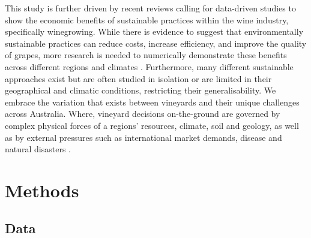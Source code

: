 \documentclass[review,12pt,authoryear]{elsarticle}
\begin{document}
\begin{linenumbers}
This study is further driven by recent reviews calling for data-driven studies to show the economic benefits of sustainable practices within the wine industry, specifically winegrowing. While there is evidence to suggest that environmentally sustainable practices can reduce costs, increase efficiency, and improve the quality of grapes, more research is needed to numerically demonstrate these benefits across different regions and climates \citep{baianoOverviewSustainabilityWine2021,marianiSustainableWinegrowingCurrent2015,montalvo-falconSustainabilityResearchWine2023, laurentReviewIssuesMethods2021}. Furthermore, many different sustainable approaches exist but are often studied in isolation or are limited in their geographical and climatic conditions, restricting their generalisability. We embrace the variation that exists between vineyards and their unique challenges across Australia. Where, vineyard decisions on-the-ground are governed by complex physical forces of a regions' resources, climate, soil and geology, as well as by external pressures such as international market demands, disease and natural disasters \citep{abadCoverCropsViticulture2021,cortezUsingDataMining2009,goodwinijeriepRegulatedDeficitIrrigation1992,hallSeasonTemporalVariation2011,kasimatiPredictingGrapeSugar2022,oliverReviewSoilPhysical2013,srivastavaNonDestructiveSensingMethods2018}.

\section{Methods}

\subsection{Data}\label{Data}


\end{linenumbers}
\end{document}
